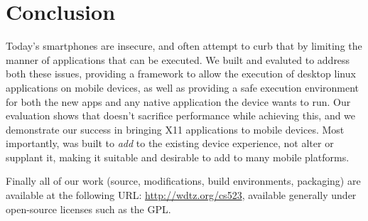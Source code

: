\section{Conclusion}
\label{sec:conclusion}
Today's smartphones are insecure, and often attempt to curb that by limiting the manner of applications that can be executed.  We built and evaluted \emph{\proj} to address both these issues, providing a framework to allow the execution of desktop linux applications on mobile devices, as well as providing a safe execution environment for both the new apps and any native application the device wants to run.  Our evaluation shows that \emph{\proj} doesn't sacrifice performance while achieving this, and we demonstrate our success in bringing X11 applications to mobile devices.  Most importantly, \emph{\proj} was built to \emph{add} to the existing device experience, not alter or supplant it, making it suitable and desirable to add to many mobile platforms.

Finally all of our work (source, modifications, build environments, packaging) are available at the following URL: \url{http://wdtz.org/cs523}, available generally under open-source licenses such as the GPL.
